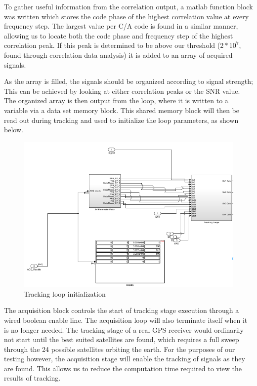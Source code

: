\documentclass[11pt]{article}
\numberwithin{equation}{subsection}
\begin{document}
	
	To gather useful information from the correlation output, a matlab function block was written which stores the code phase of the highest correlation value at every frequency step. The largest value per C/A code is found in a similar manner, allowing us to locate both the code phase and frequency step of the highest correlation peak. If this peak is determined to be above our threshold ($2*10^{7}$, found through correlation data analysis) it is added to an array of acquired signals.
	
	As the array is filled, the signals should be organized according to signal strength; This can be achieved by looking at either correlation peaks or the SNR value. The organized array is then output from the loop, where it is written to a variable via a data set memory block. This shared memory block will then be read out during tracking and used to initialize the loop parameters, as shown below.
	\begin{figure}[!h]
		\centering
		\includegraphics[width=\textwidth]{Tracking_Loop_2}	
		\caption{Tracking loop initialization}
	\end{figure}	 
	
	The acquisition block controls the start of tracking stage execution through a wired boolean enable line. The acquisition loop will also terminate itself when it is no longer needed. The tracking stage of a real GPS receiver would ordinarily not start until the best suited satellites are found, which requires a full sweep through the 24 possible satellites orbiting the earth. For the purposes of our testing however, the acquisition stage will enable the tracking of signals as they are found. This allows us to reduce the computation time required to view the results of tracking.
\end{document}
